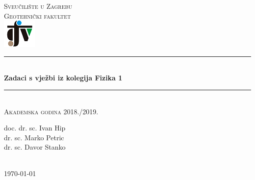\documentclass[10pt]{book}
\begin{document}
\begin{titlepage}

\newcommand{\HRule}{\rule{\linewidth}{0.5mm}} %

\center %

\textsc{\Large Sveučilište u Zagrebu\\ Geotehnički fakultet}\\[1.0cm] %

\includegraphics{logo_gfv.png}\\[2.0cm] %


\HRule \\[0.4cm]
{ \huge \bfseries Zadaci s vježbi iz kolegija Fizika 1}\\[0.4cm] %
\HRule \\[1.5cm]

\textsc{\large Akademska godina 2018./2019.}\\[0.5cm] %

\justify
 
\begin{center}
\begin{minipage}{0.8\textwidth}
\begin{justify} 
\vspace{1.2cm}
\begin{center}
doc. dr. sc. Ivan Hip\\
dr. sc. Marko Petric\\
dr. sc. Davor Stanko
                     
\end{center}

\end{justify}
\end{minipage}\\[3cm]
\today
\end{center}


\end{titlepage}
\end{document}
